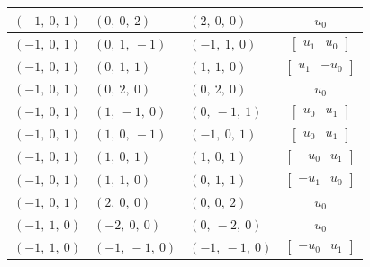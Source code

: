 \documentclass[11pt]{article}
\theoremstyle{definition}
\begin{document}
\begin{longtable}{|l|l|l|c|}
    \hline
    $\left( -1, \  0, \  1\right)$ & $\left( 0, \  0, \  2\right)$ & $\left( 2, \  0, \  0\right)$ & $u_{0}$ \\
    \hline
    $\left( -1, \  0, \  1\right)$ & $\left( 0, \  1, \  -1\right)$ & $\left( -1, \  1, \  0\right)$ & $\left[\begin{matrix}u_{1} & u_{0}\end{matrix}\right]$ \\
    \hline
    $\left( -1, \  0, \  1\right)$ & $\left( 0, \  1, \  1\right)$ & $\left( 1, \  1, \  0\right)$ & $\left[\begin{matrix}u_{1} & - u_{0}\end{matrix}\right]$ \\
    \hline
    $\left( -1, \  0, \  1\right)$ & $\left( 0, \  2, \  0\right)$ & $\left( 0, \  2, \  0\right)$ & $u_{0}$ \\
    \hline
    $\left( -1, \  0, \  1\right)$ & $\left( 1, \  -1, \  0\right)$ & $\left( 0, \  -1, \  1\right)$ & $\left[\begin{matrix}u_{0} & u_{1}\end{matrix}\right]$ \\
    \hline
    $\left( -1, \  0, \  1\right)$ & $\left( 1, \  0, \  -1\right)$ & $\left( -1, \  0, \  1\right)$ & $\left[\begin{matrix}u_{0} & u_{1}\end{matrix}\right]$ \\
    \hline
    $\left( -1, \  0, \  1\right)$ & $\left( 1, \  0, \  1\right)$ & $\left( 1, \  0, \  1\right)$ & $\left[\begin{matrix}- u_{0} & u_{1}\end{matrix}\right]$ \\
    \hline
    $\left( -1, \  0, \  1\right)$ & $\left( 1, \  1, \  0\right)$ & $\left( 0, \  1, \  1\right)$ & $\left[\begin{matrix}- u_{1} & u_{0}\end{matrix}\right]$ \\
    \hline
    $\left( -1, \  0, \  1\right)$ & $\left( 2, \  0, \  0\right)$ & $\left( 0, \  0, \  2\right)$ & $u_{0}$ \\
    \hline
    $\left( -1, \  1, \  0\right)$ & $\left( -2, \  0, \  0\right)$ & $\left( 0, \  -2, \  0\right)$ & $u_{0}$ \\
    \hline
    $\left( -1, \  1, \  0\right)$ & $\left( -1, \  -1, \  0\right)$ & $\left( -1, \  -1, \  0\right)$ & $\left[\begin{matrix}- u_{0} & u_{1}\end{matrix}\right]$ \\

\end{longtable}
\end{document}
